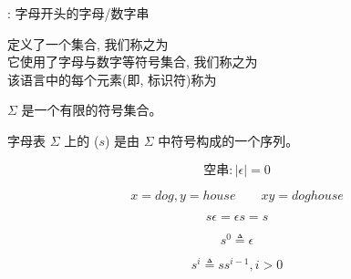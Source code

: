 \begin{frame}{}
  \begin{center}
    \id: 字母开头的字母/数字串

    \vspace{0.80cm}
    \id{} 定义了一个集合, 我们称之为 \\[15pt]
    它使用了字母与数字等符号集合, 我们称之为 \\[15pt]
    该语言中的每个元素(即, 标识符)称为
  \end{center}
\end{frame}

\begin{frame}{}
  \begin{definition}[字母表]
     $\Sigma$ 是一个有限的符号集合。
  \end{definition}

\end{frame}

\begin{frame}{}
  \begin{definition}[串]
    字母表 $\Sigma$ 上的 ($s$) 是由 $\Sigma$ 中符号构成的一个序列。
  \end{definition}

  \vspace{-0.30cm}
  \[
    \text{空串}: |\epsilon| = 0
  \]
\end{frame}

\begin{frame}{}
  \begin{definition}[串上的``连接''运算]
    \[
      x = dog, y = house \qquad xy = doghouse
    \]

    \[
      s \epsilon = \epsilon s = s
    \]
  \end{definition}

  \pause
  \vspace{0.60cm}
  \begin{definition}[串上的``指数''运算]
    \[
      s^{0} \triangleq \epsilon
    \]

    \[
      s^{i} \triangleq s s^{i-1}, i > 0
    \]
  \end{definition}
\end{frame}

